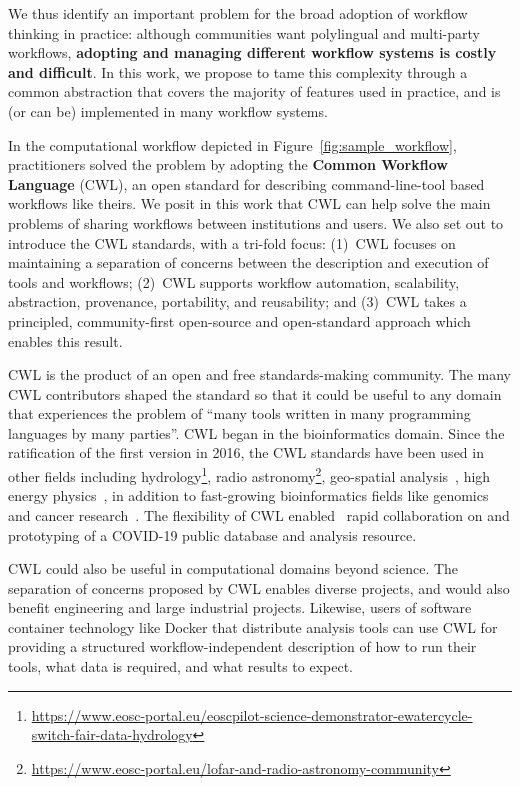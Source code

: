 \documentclass[sigconf,revew,screen,timestamp,nonacm]{acmart}
\begin{document}
We thus identify an important problem for the broad adoption of workflow thinking in practice: although communities want polylingual and multi-party workflows, \textbf{adopting and managing different workflow systems is costly and difficult}. In this work, we propose to tame this complexity through a common abstraction that covers the majority of features used in practice, and is (or can be) implemented in many workflow systems.

In the computational workflow depicted in Figure~\ref{fig:sample_workflow}, practitioners solved the problem by adopting the \textbf{Common Workflow Language} (CWL), an open standard for describing command-line-tool based workflows like theirs. We posit in this work that CWL can help solve the main problems of sharing workflows between institutions and users. We also set out to introduce the CWL standards, with a tri-fold focus: (1)~CWL focuses on maintaining a separation of concerns between the description and execution of tools and workflows; (2)~CWL supports workflow automation, scalability, abstraction, provenance, portability, and reusability; and (3)~CWL takes a principled, community-first open-source and open-standard approach which enables this result.

CWL is the product of an open and free standards-making community. The many CWL contributors shaped the standard so that it could be useful to any domain that experiences the problem of ``many tools written in many programming languages by many parties''. CWL began in the bioinformatics domain. Since the ratification of the first version in 2016, the CWL standards have been used in other fields including hydrology\footnote{\url{https://www.eosc-portal.eu/eoscpilot-science-demonstrator-ewatercycle-switch-fair-data-hydrology}}, radio astronomy\footnote{\url{https://www.eosc-portal.eu/lofar-and-radio-astronomy-community}}, geo-spatial analysis~\cite{simonis_ogc_2020,goncalves_ogc_2020,landry_ogc_2020}, high energy physics~\cite{bell_web-based_2017}, in addition to fast-growing bioinformatics fields like genomics and cancer research~\cite{kaushik_building_2019}. 
The flexibility of CWL enabled~\cite{guarracino_covid-19_2020} rapid collaboration on and prototyping of a COVID-19 public database and analysis resource.

CWL could also be useful in computational domains beyond science. The separation of concerns proposed by CWL enables diverse projects, and would also benefit engineering and large industrial projects. Likewise, users of software container technology like Docker that distribute analysis tools can use CWL for providing a structured workflow-independent description of how to run their tools, what data is required, and what results to expect.
\end{document}
